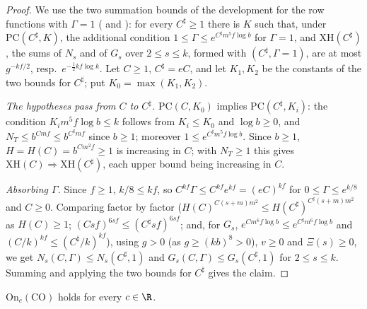 \begin{proof}
We use the two summation bounds of the development for the row functions with $\Gamma=1$
( and ):
for every $C^\sharp\ge1$ there is $K$ such that, under $\mathrm{PC}(C^\sharp,K)$, the additional condition $1\le\Gamma\le
e^{C^\sharp m^5f\log b}$ for $\Gamma=1$, and $\mathrm{XH}(C^\sharp)$, the sums of $N_s$ and of $G_s$ over $2\le s\le k$, formed with
$(C^\sharp,\Gamma=1)$, are at most $g^{-kf/2}$, resp.\ $e^{-\frac12kf\log k}$. Let $C\ge1$, $C^\sharp=eC$, and let $K_1,K_2$ be the
constants of the two bounds for $C^\sharp$; put $K_0=\max(K_1,K_2)$.

\emph{The hypotheses pass from $C$ to $C^\sharp$.} $\mathrm{PC}(C,K_0)$ implies $\mathrm{PC}(C^\sharp,K_i)$: the condition
$K_im^5f\log b\le k$ follows from $K_i\le K_0$ and $\log b\ge0$, and $N_T\le b^{Cmf}\le b^{C^\sharp mf}$ since $b\ge1$; moreover
$1\le e^{C^\sharp m^5f\log b}$. Since $b\ge1$, $H=H(C)=b^{Cm^2f}\ge1$ is increasing in $C$; with $N_T\ge1$ this gives
$\mathrm{XH}(C)\Rightarrow\mathrm{XH}(C^\sharp)$, each upper bound being increasing in $C$.

\emph{Absorbing $\Gamma$.} Since $f\ge1$, $k/8\le kf$, so $C^{kf}\Gamma\le C^{kf}e^{kf}=(eC)^{kf}$ for $0\le\Gamma\le e^{k/8}$ and $C\ge0$.
Comparing factor by factor ($H(C)^{C(s+m)m^2}\le H(C^\sharp)^{C^\sharp(s+m)m^2}$ as $H(C)\ge1$; $(Csf)^{6sf}\le(C^\sharp sf)^{6sf}$; and, for
$G_s$, $e^{Cm^6f\log b}\le e^{C^\sharp m^6f\log b}$ and $(C/k)^{kf}\le(C^\sharp/k)^{kf}$), using $g>0$ (as $g\ge(kb)^8>0$), $v\ge0$ and
$\Xi(s)\ge0$, we get $N_s(C,\Gamma)\le N_s(C^\sharp,1)$ and $G_s(C,\Gamma)\le G_s(C^\sharp,1)$ for $2\le s\le k$. Summing and applying the two
bounds for $C^\sharp$ gives the claim.
\end{proof}

\begin{proposition}\label{pf:open0:coll}
$\mathrm{On}_c(\mathrm{CO})$ holds for every $c\in\R$.
\ \
\end{proposition}

